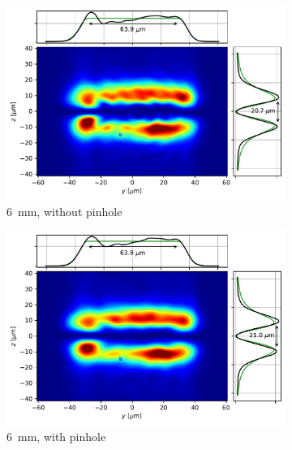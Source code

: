 \begin{figure}
    \centering
    \begin{subfigure}{0.45\textwidth}
        \includegraphics[width=\textwidth]{chapters/chapter_3/figures/large_nopin.pdf}
        \caption{\SI{6}{mm}, without pinhole}
    \end{subfigure}
    \hfill
    \begin{subfigure}{0.45\textwidth}
        \includegraphics[width=\textwidth]{chapters/chapter_3/figures/large_pin.pdf}
        \caption{\SI{6}{mm}, with pinhole}
    \end{subfigure}\\
    \vspace{0.3cm}
    \begin{subfigure}{0.45\textwidth}

\end{subfigure}
\end{figure}
